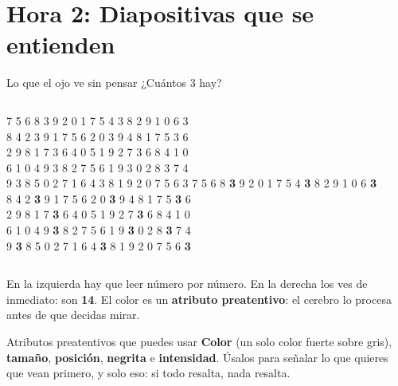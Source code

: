 \documentclass[aspectratio=169,11pt]{beamer}
\begin{document}
\section{Hora 2: Diapositivas que se entienden}
\begin{frame}[t]{Lo que el ojo ve sin pensar}
  \small ¿Cuántos 3 hay?
  \vspace{0.1cm}
  \begin{columns}[T,onlytextwidth]
    \centering
    \ttfamily\footnotesize
    7 5 6 8 3 9 2 0 1 7 5 4 3 8 2 9 1 0 6 3\\
      8 4 2 3 9 1 7 5 6 2 0 3 9 4 8 1 7 5 3 6\\
      2 9 8 1 7 3 6 4 0 5 1 9 2 7 3 6 8 4 1 0\\
      6 1 0 4 9 3 8 2 7 5 6 1 9 3 0 2 8 3 7 4\\
      9 3 8 5 0 2 7 1 6 4 3 8 1 9 2 0 7 5 6 3
    \normalfont
    \centering
    \ttfamily\footnotesize
    7 5 6 8 {\color{esumerOrange}\textbf{3}} 9 2 0 1 7 5 4 {\color{esumerOrange}\textbf{3}} 8 2 9 1 0 6 {\color{esumerOrange}\textbf{3}}\\
      8 4 2 {\color{esumerOrange}\textbf{3}} 9 1 7 5 6 2 0 {\color{esumerOrange}\textbf{3}} 9 4 8 1 7 5 {\color{esumerOrange}\textbf{3}} 6\\
      2 9 8 1 7 {\color{esumerOrange}\textbf{3}} 6 4 0 5 1 9 2 7 {\color{esumerOrange}\textbf{3}} 6 8 4 1 0\\
      6 1 0 4 9 {\color{esumerOrange}\textbf{3}} 8 2 7 5 6 1 9 {\color{esumerOrange}\textbf{3}} 0 2 8 {\color{esumerOrange}\textbf{3}} 7 4\\
      9 {\color{esumerOrange}\textbf{3}} 8 5 0 2 7 1 6 4 {\color{esumerOrange}\textbf{3}} 8 1 9 2 0 7 5 6 {\color{esumerOrange}\textbf{3}}
    \normalfont
  \end{columns}
  \vspace{0.2cm}
  \footnotesize En la izquierda hay que leer número por número. En la derecha
  los ves de inmediato: son \textbf{14}. El color es un \textbf{atributo
  preatentivo}: el cerebro lo procesa antes de que decidas mirar.
  \vspace{0.1cm}
  \begin{block}{Atributos preatentivos que puedes usar}
    \footnotesize \textbf{Color} (un solo color fuerte sobre gris),
    \textbf{tamaño}, \textbf{posición}, \textbf{negrita} e
    \textbf{intensidad}. Úsalos para señalar lo que quieres que vean primero,
    y solo eso: si todo resalta, nada resalta.
  \end{block}
\end{frame}
\end{document}

